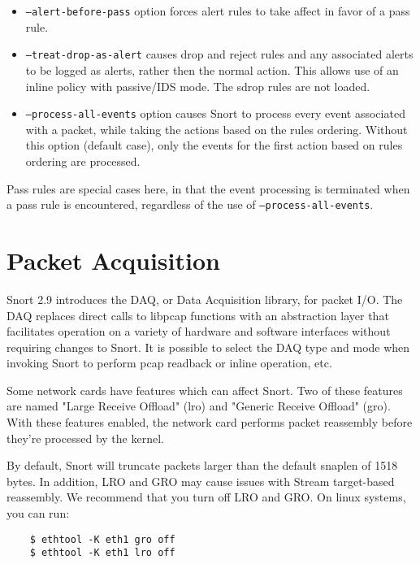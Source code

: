 \documentclass[english]{report}
\newenvironment{note}{
\samepage
    \vspace{10pt}{\textsf{
        {\hspace{7pt}\Huge{$\triangle$\hspace{-12.5pt}{\Large{$^!$}}}}\hspace{5pt}
        {\Large{NOTE}}
    }
    }
   \begin{center}
    \par\vspace{-17pt}

    \begin{lrbox}{\savepar}
    \begin{minipage}[r]{6in}
}
{
    \end{minipage}
    \end{lrbox}
    \fbox{
        \usebox{
            \savepar
	}
    }
    \par\vskip10pt
    \end{center}
}
\newenvironment{note}{
        \begin{rawhtml}
        <p><table border="1"><tr><td><b>
        Note:&nbsp;&nbsp;</b>
        \end{rawhtml}
}{
        \begin{rawhtml}
        </b></td></tr></table></p>
        \end{rawhtml}
}
\begin{document}
\begin{itemize}

\item \texttt{--alert-before-pass} option forces alert rules to take
affect in favor of a pass rule.

\item \texttt{--treat-drop-as-alert} causes drop and reject rules and 
any associated alerts to be logged as alerts, rather then the normal 
action.  This allows use of an inline policy with passive/IDS mode.
The sdrop rules are not loaded.

\item \texttt{--process-all-events} option causes Snort to process
every event associated with a packet, while taking the actions based
on the rules ordering.  Without this option (default case), only the
events for the first action based on rules ordering are processed.

\end{itemize}

\begin{note}

Pass rules are special cases here, in that the event processing is terminated
when a pass rule is encountered, regardless of the use of
\texttt{--process-all-events}.

\end{note}

\section{Packet Acquisition}

Snort 2.9 introduces the DAQ, or Data Acquisition library, for packet I/O.  The
DAQ replaces direct calls to libpcap functions with an abstraction layer that
facilitates operation on a variety of hardware and software interfaces without
requiring changes to Snort.  It is possible to select the DAQ type and mode
when invoking Snort to perform pcap readback or inline operation, etc.

\begin{note}

Some network cards have features which can affect Snort. Two of these features
are named "Large Receive Offload" (lro) and "Generic Receive Offload" (gro). 
With these features enabled, the network card performs packet reassembly 
before they're processed by the kernel.

By default, Snort will truncate packets larger than the default snaplen of 1518
bytes. In addition, LRO and GRO may cause issues with Stream target-based
reassembly. We recommend that you turn off LRO and GRO. On linux systems, you can run:

\begin{verbatim}
    $ ethtool -K eth1 gro off
    $ ethtool -K eth1 lro off
\end{verbatim}

\end{note}
\end{document}
